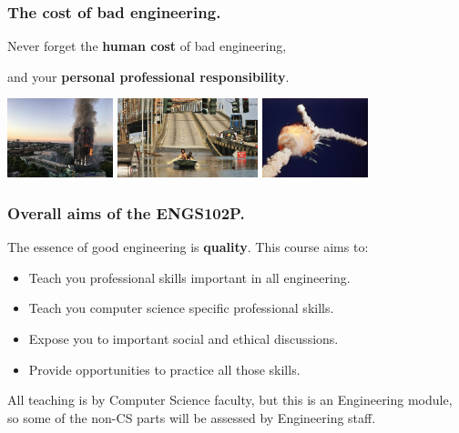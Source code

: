 \documentclass{beamer} %
\newcommand\emc[1]{\textcolor{midred}{\textbf{#1}}}
\begin{document}
\begin{frame}
\frametitle{The cost of bad engineering.}

Never forget the \emc{human cost} of bad engineering, 

and your \emc{personal professional responsibility}.

\vspace{10mm}
\centering
\includegraphics[height=23mm]{img/Grenfell.jpg} \quad
\includegraphics[height=23mm]{img/katrina.jpg} \quad
\includegraphics[height=23mm]{img/challenger.jpg}

\end{frame}

\begin{frame}
\frametitle{Overall aims of the ENGS102P.} 

The essence of good engineering is \emc{quality}. This course aims to:

\begin{itemize}
	\item Teach you professional skills important in all engineering.
	\item Teach you computer science specific professional skills.
	\item Expose you to important social and ethical discussions.
	\item Provide opportunities to practice all those skills.
\end{itemize}

\vspace{3mm} All teaching is by Computer Science faculty, but this is
an Engineering module, so some of the non-CS parts will be assessed by
Engineering staff.

\end{frame}
\end{document}
